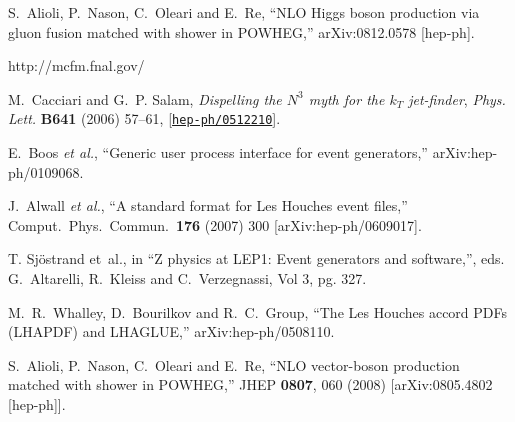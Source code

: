 \documentclass[paper]{JHEP3}
\begin{document}
\begin{thebibliography}{10}
  S.~Alioli, P.~Nason, C.~Oleari and E.~Re,
``NLO Higgs boson production via gluon fusion matched with shower in
  POWHEG,''
  arXiv:0812.0578 [hep-ph].

  http://mcfm.fnal.gov/


M.~Cacciari and G.~P. Salam, {\it {Dispelling the $N^3$ myth for the $k_T$
  jet-finder}},  {\em Phys. Lett.} {\bf B641} (2006) 57--61,
  [\href{http://xxx.lanl.gov/abs/hep-ph/0512210}{{\tt hep-ph/0512210}}].




  E.~Boos {\it et al.},
  ``Generic user process interface for event generators,''
  arXiv:hep-ph/0109068.

  J.~Alwall {\it et al.},
  ``A standard format for Les Houches event files,''
  Comput.\ Phys.\ Commun.\  {\bf 176} (2007) 300
  [arXiv:hep-ph/0609017].


 T. Sj\"ostrand et~al., in
  ``Z physics at LEP1: Event generators and software,'',  eds.
  G.~Altarelli, R.~Kleiss and C.~Verzegnassi, Vol 3, pg. 327.


  M.~R.~Whalley, D.~Bourilkov and R.~C.~Group,
  ``The Les Houches accord PDFs (LHAPDF) and LHAGLUE,''
  arXiv:hep-ph/0508110.


  S.~Alioli, P.~Nason, C.~Oleari and E.~Re,
  ``NLO vector-boson production matched with shower in POWHEG,''
  JHEP {\bf 0807}, 060 (2008)
  [arXiv:0805.4802 [hep-ph]].




\end{thebibliography}
\end{document}

